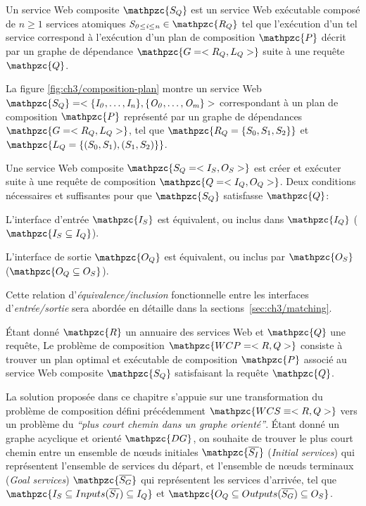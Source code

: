 \begin{mydef}
  Un service Web composite $\mathpzc{S_Q}$ est un service Web
  exécutable composé de $n \geq 1$ services atomiques
  $\mathit{S_{0 \leq i \leq n}} \in \mathpzc{R_Q}$ tel que l'exécution
  d'un tel service correspond à l'exécution d'un plan de composition
  $\mathpzc{P}$ décrit par un graphe de dépendance
  $\mathpzc{G = <R_Q,L_Q>}$ suite à une requête $\mathpzc{Q}$.\medskip
\end{mydef}

La figure \ref{fig:ch3/composition-plan} montre un service Web
$\mathpzc{S_Q} = <\mathit{\{I_0, \dots, I_n\}}, \mathit{\{O_0, \dots,
  O_m\}}>$
correspondant à un plan de composition $\mathpzc{P}$ représenté par un
graphe de dépendances $\mathpzc{G =<R_Q,L_Q>}$, tel que
$\mathpzc{R_Q = \{S_0, S_1, S_2\}}$ et
$\mathpzc{L_Q = \{(S_0, S_1), (S_1, S_2)\}}$.\medskip

Une service Web composite $\mathpzc{S_Q = <I_S, O_S>}$ est créer et
exécuter suite à une requête de composition $\mathpzc{Q=<I_Q, O_Q>}$.
Deux conditions nécessaires et suffisantes pour que $\mathpzc{S_Q}$
satisfasse $\mathpzc{Q}$:\medskip

\begin{enumerateRoman}
\item L'interface d'entrée $\mathpzc{I_S}$ est équivalent, ou inclus
  dans $\mathpzc{I_Q}$ ($\mathpzc{I_S \subseteq I_Q}$).

\item L'interface de sortie $\mathpzc{O_Q}$ est équivalent, ou inclus
  par $\mathpzc{O_S}$ ($\mathpzc{O_Q \subseteq O_S}$).\medskip
\end{enumerateRoman}
\enddescription

Cette relation d'\emph{équivalence/inclusion} fonctionnelle entre les
interfaces d'\emph{entrée/sortie} sera abordée en détaille dans la
sections~\ref{sec:ch3/matching}.\medskip

\begin{mydef}
  Étant donné $\mathpzc{R}$ un annuaire des services Web et
  $\mathpzc{Q}$ une requête, Le problème de composition
  $\mathpzc{WCP=<R,Q>}$ consiste à trouver un plan optimal et
  exécutable de composition $\mathpzc{P}$ associé au service Web
  composite $\mathpzc{S_Q}$ satisfaisant la requête
  $\mathpzc{Q}$.\medskip
\end{mydef}



La solution proposée dans ce chapitre s'appuie sur une transformation
du problème de composition défini précédemment
$\mathpzc{WCS \equiv <R,Q>}$ vers un problème du \textit{``plus court
  chemin dans un graphe orienté''}. Étant donné un graphe acyclique et
orienté $\mathpzc{DG}$, on souhaite de trouver le plus court chemin
entre un ensemble de nœuds initiales $\mathpzc{\overline{S_I}}$
(\emph{Initial services}) qui représentent l'ensemble de services du
départ, et l'ensemble de nœuds terminaux (\emph{Goal services})
$\mathpzc{\overline{S_G}}$ qui représentent les services d'arrivée,
tel que $\mathpzc{I_S \subseteq Inputs(\overline{S_I}) \subseteq I_Q}$
et
$\mathpzc{O_Q \subseteq Outputs(\overline{S_G}) \subseteq
  O_S}$.\medskip

